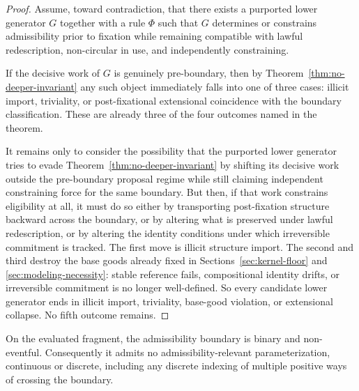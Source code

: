 \begin{proof}
Assume, toward contradiction, that there exists a purported lower generator $G$ together with a rule $\Phi$ such that $G$ determines or constrains admissibility prior to fixation while remaining compatible with lawful redescription, non-circular in use, and independently constraining.

If the decisive work of $G$ is genuinely pre-boundary, then by Theorem~\ref{thm:no-deeper-invariant} any such object immediately falls into one of three cases: illicit import, triviality, or post-fixational extensional coincidence with the boundary classification. These are already three of the four outcomes named in the theorem.

It remains only to consider the possibility that the purported lower generator tries to evade Theorem~\ref{thm:no-deeper-invariant} by shifting its decisive work outside the pre-boundary proposal regime while still claiming independent constraining force for the same boundary. But then, if that work constrains eligibility at all, it must do so either by transporting post-fixation structure backward across the boundary, or by altering what is preserved under lawful redescription, or by altering the identity conditions under which irreversible commitment is tracked. The first move is illicit structure import. The second and third destroy the base goods already fixed in Sections~\ref{sec:kernel-floor} and \ref{sec:modeling-necessity}: stable reference fails, compositional identity drifts, or irreversible commitment is no longer well-defined. So every candidate lower generator ends in illicit import, triviality, base-good violation, or extensional collapse. No fifth outcome remains.\cite{MaleyNecessity}
\end{proof}

\begin{theorem}
\label{thm:derived-boundary-axiom}
On the evaluated fragment, the admissibility boundary is binary and non-eventful. Consequently it admits no admissibility-relevant parameterization, continuous or discrete, including any discrete indexing of multiple positive ways of crossing the boundary.
\end{theorem}

